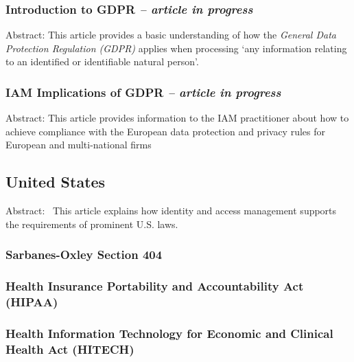 \hypertarget{introduction-to-gdpr-article-in-progress}{%
\subsubsection{\texorpdfstring{Introduction to GDPR \emph{-- article in
progress}}{Introduction to GDPR -- article in progress}}\label{introduction-to-gdpr-article-in-progress}}

Abstract: This article provides a basic understanding of how the
\emph{General Data Protection Regulation (GDPR)} applies when processing
`any information relating to an identified or identifiable natural
person'.

\hypertarget{iam-implications-of-gdpr-article-in-progress}{%
\subsubsection{\texorpdfstring{IAM Implications of GDPR \emph{-- article in
progress}}{IAM Implications of GDPR -- article in progress}}\label{iam-implications-of-gdpr-article-in-progress}}

Abstract: This article provides information to the IAM practitioner
about how to achieve compliance with the European data protection and
privacy rules for European and multi-national firms

\hypertarget{united-states}{%
\subsection{United States}\label{united-states}}

Abstract:~ This article explains how identity and access management
supports the requirements of prominent U.S. laws.

\hypertarget{sarbanes-oxley-section-404}{%
\subsubsection{Sarbanes-Oxley Section
404}\label{sarbanes-oxley-section-404}}

\hypertarget{health-insurance-portability-and-accountability-act-hipaa}{%
\subsubsection{Health Insurance Portability and Accountability Act
(HIPAA)}\label{health-insurance-portability-and-accountability-act-hipaa}}

\hypertarget{health-information-technology-for-economic-and-clinical-health-act-hitech}{%
\subsubsection{Health Information Technology for Economic and Clinical
Health Act
(HITECH)}\label{health-information-technology-for-economic-and-clinical-health-act-hitech}}

